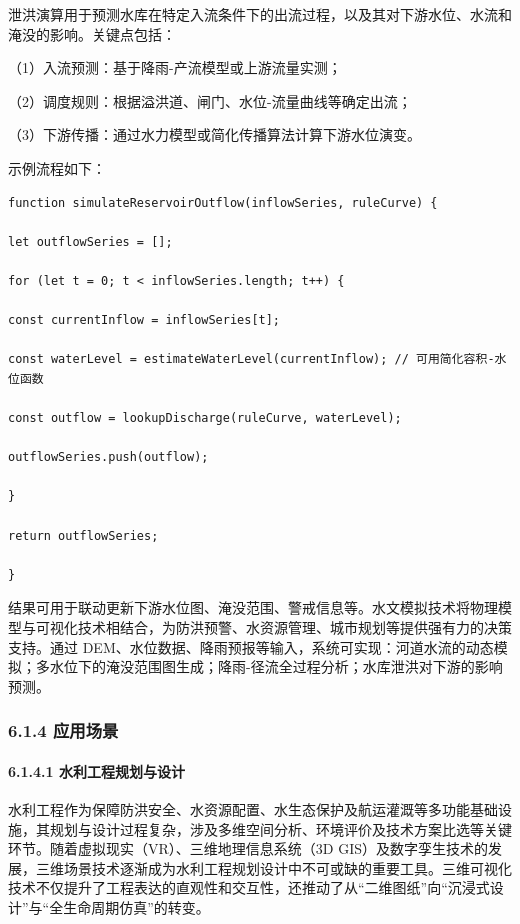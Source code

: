 泄洪演算用于预测水库在特定入流条件下的出流过程，以及其对下游水位、水流和淹没的影响。关键点包括：

（1）入流预测：基于降雨-产流模型或上游流量实测；

（2）调度规则：根据溢洪道、闸门、水位-流量曲线等确定出流；

（3）下游传播：通过水力模型或简化传播算法计算下游水位演变。

示例流程如下：

\begin{verbatim}
function simulateReservoirOutflow(inflowSeries, ruleCurve) {

let outflowSeries = [];

for (let t = 0; t < inflowSeries.length; t++) {

const currentInflow = inflowSeries[t];

const waterLevel = estimateWaterLevel(currentInflow); // 可用简化容积-水位函数

const outflow = lookupDischarge(ruleCurve, waterLevel);

outflowSeries.push(outflow);

}

return outflowSeries;

}
\end{verbatim}

结果可用于联动更新下游水位图、淹没范围、警戒信息等。水文模拟技术将物理模型与可视化技术相结合，为防洪预警、水资源管理、城市规划等提供强有力的决策支持。通过 DEM、水位数据、降雨预报等输入，系统可实现：河道水流的动态模拟；多水位下的淹没范围图生成；降雨-径流全过程分析；水库泄洪对下游的影响预测。

\subsubsection{6.1.4 应用场景}\label{ux5e94ux7528ux573aux666f}

\paragraph{6.1.4.1 水利工程规划与设计}\label{ux6c34ux5229ux5de5ux7a0bux89c4ux5212ux4e0eux8bbeux8ba1}

水利工程作为保障防洪安全、水资源配置、水生态保护及航运灌溉等多功能基础设施，其规划与设计过程复杂，涉及多维空间分析、环境评价及技术方案比选等关键环节。随着虚拟现实（VR）、三维地理信息系统（3D GIS）及数字孪生技术的发展，三维场景技术逐渐成为水利工程规划设计中不可或缺的重要工具。三维可视化技术不仅提升了工程表达的直观性和交互性，还推动了从``二维图纸''向``沉浸式设计''与``全生命周期仿真''的转变。

